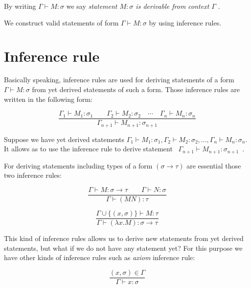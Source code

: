 \documentclass[12pt,a4paper]{report}
\newcommand{\turst}[3]{$#1 \vdash #2 : #3$\xspace}
\newcommand{\GMS}{\turst{\Gamma}{M}{\sigma}}
\begin{document}
	By writing \GMS we say 
	{\it statement $M : \sigma$ is derivable from context $\Gamma$ }.

	We construct valid statements of form \GMS by using inference rules.
	
		
\section{Inference rule}		
	
	Basically speaking, inference rules are used for deriving statements of a form 
	\GMS from yet derived statements of such a form.
	Those inference rules are written in the following form:
	
	\begin{equation*}
		\frac{\Gamma_1 \vdash M_1 : \sigma_1 \qquad
			  \Gamma_2 \vdash M_2 : \sigma_2 \quad
			  \dotsm \quad
		      \Gamma_n \vdash M_n : \sigma_n}
		     {\Gamma_{n+1} \vdash M_{n+1} : \sigma_{n+1}}
	\end{equation*}	
	
	Suppose we have yet derived statements 
	$\Gamma_1 \vdash M_1 : \sigma_1 ,
	 \Gamma_2 \vdash M_2 : \sigma_2 ,
	 \dots ,
	 \Gamma_n \vdash M_n : \sigma_n$. 
	It allows as to use the inference rule to derive statement
	\mbox{ $\Gamma_{n+1} \vdash M_{n+1} : \sigma_{n+1}$ }.
	 
	For deriving statements including types of a form 
	$(\sigma \rightarrow \tau)$ are essential those two 
	inference rules:
	
	\begin{equation*}
		\frac{\Gamma \vdash M : \sigma \rightarrow \tau \qquad
			  \Gamma \vdash N : \sigma }
		     {\Gamma \vdash (M N) : \tau }
	\end{equation*}	
	
	\begin{equation*}
		\frac{\Gamma \cup \{ ( x,\sigma ) \} \vdash M : \tau }
		     {\Gamma \vdash (\lambda x . M) : \sigma \rightarrow \tau }
	\end{equation*}		 
	 
	This kind of inference rules allows us to derive new statements from yet derived statements, but 
	what if we do not have any statement yet? 
	For this purpose we have other kinds of inference rules such as {\it axiom} inference rule:   
	
	\begin{equation*}
		\frac{( x , \sigma )  \in \Gamma}
		     {\Gamma \vdash x : \sigma}
	\end{equation*}	
	
\end{document}
